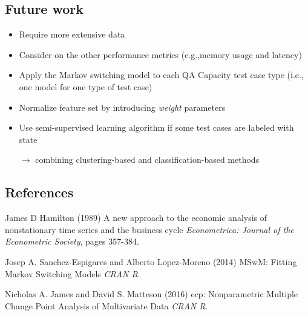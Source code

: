 \documentclass{beamer}
\begin{document}
\subsection{Future work}
\begin{frame}
\begin{itemize}
	\item Require more extensive data
	\item Consider on the other performance metrics (e.g.,memory usage and latency) 
	\item Apply the Markov switching model to each QA Capacity test case type (i.e., one model for one type of test case)
	\item Normalize feature set by introducing \textit{weight} parameters
	\item Use semi-supervised learning algorithm if some test cases are labeled with state
	
	$\rightarrow$ combining clustering-based and classification-based methods 
\end{itemize}
\end{frame}

\subsection{References}
\begin{frame}
\footnotesize{
	\begin{thebibliography}{99} %
		 James D Hamilton (1989)
		\newblock A new approach to the economic analysis of nonstationary time series and the business cycle
		\newblock \emph{Econometrica: Journal of the Econometric Society}, pages 357-384.
	\end{thebibliography}
	
	\begin{thebibliography}{99} %
		 Josep A. Sanchez-Espigares and Alberto Lopez-Moreno (2014)
		\newblock MSwM: Fitting Markov Switching Models
		\newblock \emph{CRAN R}.
	\end{thebibliography}

	\begin{thebibliography}{99} %
		 Nicholas A. James and David S. Matteson (2016)
		\newblock ecp: Nonparametric Multiple Change Point Analysis of Multivariate Data
		\newblock \emph{CRAN R}.
	\end{thebibliography}
}
\end{frame}
\end{document}
